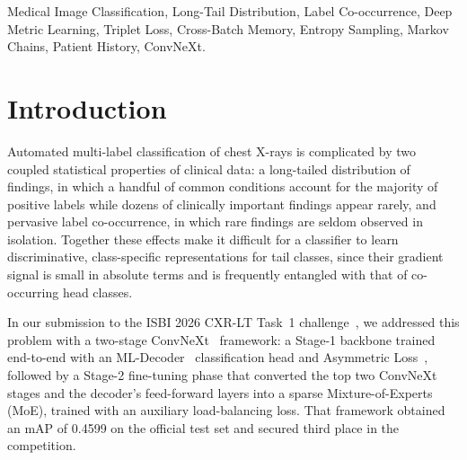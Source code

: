 \documentclass[conference]{IEEEtran}
\begin{document}
\begin{abstract}
consistently on the head and medium classes; with the history withheld, as on the test set, whose patients have no history, the gain is zero.
\end{abstract}

\begin{IEEEkeywords}
Medical Image Classification, Long-Tail Distribution, Label Co-occurrence, Deep Metric Learning, Triplet Loss, Cross-Batch Memory, Entropy Sampling, Markov Chains, Patient History, ConvNeXt.
\end{IEEEkeywords}

\section{Introduction}
Automated multi-label classification of chest X-rays is complicated by two coupled statistical properties of clinical data: a long-tailed distribution of findings, in which a handful of common conditions account for the majority of positive labels while dozens of clinically important findings appear rarely, and pervasive label co-occurrence, in which rare findings are seldom observed in isolation. Together these effects make it difficult for a classifier to learn discriminative, class-specific representations for tail classes, since their gradient signal is small in absolute terms and is frequently entangled with that of co-occurring head classes.

In our submission to the ISBI 2026 CXR-LT Task~1 challenge~\cite{b12}, we addressed this problem with a two-stage ConvNeXt~\cite{b1} framework: a Stage-1 backbone trained end-to-end with an ML-Decoder~\cite{b2} classification head and Asymmetric Loss~\cite{b3}, followed by a Stage-2 fine-tuning phase that converted the top two ConvNeXt stages and the decoder's feed-forward layers into a sparse Mixture-of-Experts (MoE), trained with an auxiliary load-balancing loss. That framework obtained an mAP of 0.4599 on the official test set and secured third place in the competition.
\end{document}
